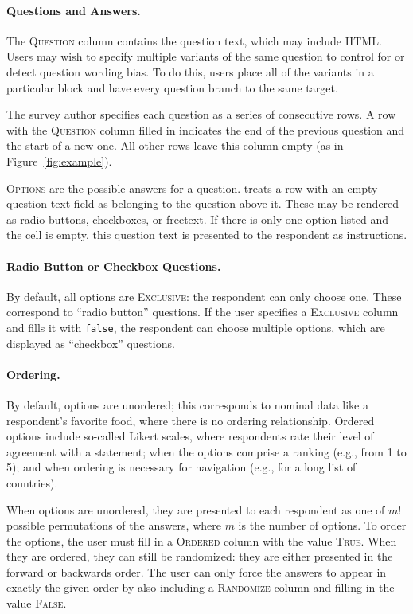 \paragraph{Questions and Answers.}
The \textsc{Question} column contains the question text, which may
include HTML. Users may wish to specify multiple variants of the same question
to control for or detect question wording bias. To do this, users place
all of the variants in a particular block and have every question branch
to the same target.

The survey author specifies each question as a series of consecutive
rows. A row with the \textsc{Question} column filled in indicates the
end of the previous question and the start of a new one. All other
rows leave this column empty (as in Figure~\ref{fig:example}).

\textsc{Options} are the possible answers for a question. \surveyman{}
treats a row with an empty question text field as belonging to the
question above it. These may be rendered as radio buttons, checkboxes,
or freetext. If there is only one option listed and the cell is empty,
this question text is presented to the respondent as instructions.

\paragraph{Radio Button or Checkbox Questions.}
By default, all options are \textsc{Exclusive}: the respondent can
only choose one. These correspond to ``radio button'' questions. If
the user specifies a \textsc{Exclusive} column and fills it with
\texttt{false}, the respondent can choose multiple options, which are
displayed as ``checkbox'' questions.

\paragraph{Ordering.}
By default, options are unordered; this corresponds to nominal
data like a respondent's favorite food, where there is no ordering
relationship. Ordered options include so-called Likert scales, where
respondents rate their level of agreement with a statement; when the
options comprise a ranking (e.g., from 1 to 5); and when ordering is
necessary for navigation (e.g., for a long list of countries).

When options are unordered, they are presented to each respondent as one
of $m!$ possible permutations of the answers, where $m$ is the
number of options. To order the options, the user must fill in a
\textsc{Ordered} column with the value \textsc{True}. When they are
ordered, they can still be randomized: they are either
presented in the forward or backwards order. The user can only force the
answers to appear in exactly the given order by also including a
\textsc{Randomize} column and filling in the value \textsc{False}.

